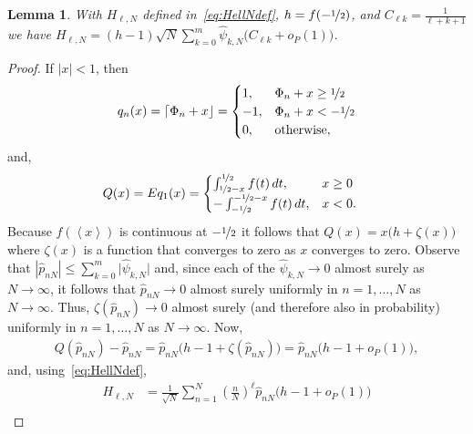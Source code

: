 \documentclass[aap,preprint]{imsart}
\newcommand{\fracpart}[1]{\left\langle #1 \right\rangle}
\newcommand{\abs}[1]{\left\vert #1 \right\vert}
\newcommand{\sabs}[1]{\vert #1 \vert}
\newcommand{\round}[1]{{\left\lceil #1 \right\rfloor}}
\newtheorem{lemma}{Lemma}
\begin{document}
\begin{lemma}\label{lem:sumpNhilb}
With $H_{\ell,N}$ defined in~\eqref{eq:HellNdef}, $h = f(-\nicefrac{1}{2})$, and  $C_{\ell k} = \tfrac{1}{\ell + k + 1}$ we have $H_{\ell,N} = (h-1)\sqrt{N} \sum_{k=0}^{m}  \widehat{\psi}_{k,N} \big(C_{\ell k} + o_P(1)\big)$.
\end{lemma}
\begin{proof}
If $\abs{x} < 1$, then
\[
q_n(x)  = \round{\Phi_n + x} = \begin{cases}
1, & \Phi_n + x  \geq \nicefrac{1}{2} \\
-1, & \Phi_n + x  < -\nicefrac{1}{2} \\
0, & \text{otherwise},
\end{cases}
\]
and,
\begin{align*}
Q(x) = Eq_1(x) &=  \begin{cases}
\int_{\nicefrac{1}{2} -x }^{\nicefrac{1}{2}}f(t)\,dt, &   x \geq 0 \\
-\int_{-\nicefrac{1}{2}}^{-\nicefrac{1}{2} - x }f(t)\,dt, &  x  < 0.
\end{cases} 
\end{align*}
Because $f(\fracpart{x})$ is continuous at $-\nicefrac{1}{2}$ it follows that $Q(x) = x \big( h + \zeta(x) \big)$
where $\zeta(x)$ is a function that converges to zero as $x$ converges to zero.  
Observe that $\abs{\widehat{p}_{nN}} \leq \sum_{k=0}^m\sabs{ \widehat{\psi}_{k,N}}$ and, since each of the $\widehat{\psi}_{k,N} \rightarrow 0$ almost surely as $N\rightarrow\infty$, it follows that $\widehat{p}_{nN} \rightarrow 0$ almost surely uniformly in $n = 1, \dots, N$ as $N\rightarrow\infty$.  Thus, $\zeta(\widehat{p}_{nN}) \rightarrow 0$ almost surely (and therefore also in probability) uniformly in $n = 1, \dots, N$ as $N\rightarrow\infty$.  Now,
\begin{align*}
Q(\widehat{p}_{nN}) - \widehat{p}_{nN} = \widehat{p}_{nN}\big( h - 1 + \zeta(\widehat{p}_{nN}) \big) = \widehat{p}_{nN}\big( h - 1 + o_P(1) \big), 
\end{align*}
and, using~\eqref{eq:HellNdef},
\begin{align*}
H_{\ell,N} &= \frac{1}{\sqrt{N}}\sum_{n=1}^{N}(\tfrac{n}{N})^\ell \widehat{p}_{nN}\big( h - 1 + o_P(1) \big)  \\

\end{align*}
\end{proof}
\end{document}
